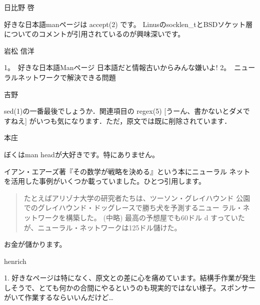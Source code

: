 
\begin{prework}{ 日比野 啓 }

好きな日本語manページは accept(2) です。
Linusのsocklen\_tとBSDソケット層についてのコメントが引用されているのが興味深いです。

\end{prework}


\begin{prework}{ 岩松 信洋 }

1。　好きな日本語Manページ
日本語だと情報古いからみんな嫌いよ!
2。　ニューラルネットワークで解決できる問題

\end{prework}

\begin{prework}{ 吉野 }


sed(1)の一番最後でしょうか．関連項目の
regex(5) [うーん、書かないとダメですねえ] 
がいつも気になります．ただ，原文では既に削除されています．

\end{prework}



\begin{prework}{ 本庄 }


ぼくはman headが大好きです。特にありません。



イアン・エアーズ著『その数学が戦略を決める』という本にニューラル
ネットを活用した事例がいくつか載っていました。ひとつ引用します。

\begin{quotation}
たとえばアリゾナ大学の研究者たちは、ツーソン・グレイハウンド
公園でのグレイハウンド・ドッグレースで勝ち犬を予測するニュー
ラル・ネットワークを構築した。 (中略) 最高の予想屋でも60ドル
d すっていたが、ニューラル・ネットワークは125ドル儲けた。
\end{quotation}

お金が儲かります。


\end{prework}



\begin{prework}{ henrich }

1. 好きなページは特になく、原文との差に心を痛めています。結構手作業が発生しそうで、とても何かの合間にやるというのも現実的ではない様子。スポンサーがいて作業するならいいんだけど…

\end{prework}

